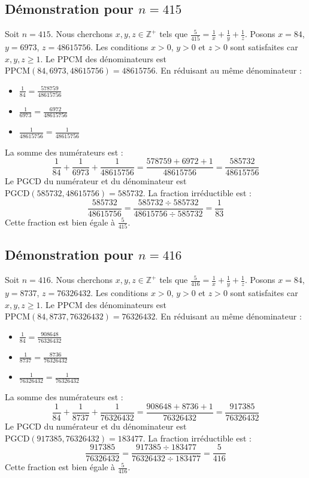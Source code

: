 \documentclass[11pt,a4paper]{article}
\begin{document}
\subsection{Démonstration pour $n = 415$}
Soit $n = 415$. Nous cherchons $x, y, z \in \mathbb{Z}^{+}$ tels que $\frac{5}{415} = \frac{1}{x} + \frac{1}{y} + \frac{1}{z}$.
Posons $x = 84$, $y = 6973$, $z = 48615756$.
Les conditions $x > 0$, $y > 0$ et $z > 0$ sont satisfaites car $x, y, z \geq 1$.
Le PPCM des dénominateurs est $\text{PPCM}(84, 6973, 48615756) = 48615756$.
En réduisant au même dénominateur :
\begin{itemize}
    \item $\frac{1}{84} = \frac{578759}{48615756}$
    \item $\frac{1}{6973} = \frac{6972}{48615756}$
    \item $\frac{1}{48615756} = \frac{1}{48615756}$
\end{itemize}
La somme des numérateurs est :
$$ \frac{1}{84} + \frac{1}{6973} + \frac{1}{48615756} = \frac{578759 + 6972 + 1}{48615756} = \frac{585732}{48615756} $$
Le PGCD du numérateur et du dénominateur est $\text{PGCD}(585732, 48615756) = 585732$.
La fraction irréductible est :
$$ \frac{585732}{48615756} = \frac{585732 \div 585732}{48615756 \div 585732} = \frac{1}{83} $$
Cette fraction est bien égale à $\frac{5}{415}$.

\subsection{Démonstration pour $n = 416$}
Soit $n = 416$. Nous cherchons $x, y, z \in \mathbb{Z}^{+}$ tels que $\frac{5}{416} = \frac{1}{x} + \frac{1}{y} + \frac{1}{z}$.
Posons $x = 84$, $y = 8737$, $z = 76326432$.
Les conditions $x > 0$, $y > 0$ et $z > 0$ sont satisfaites car $x, y, z \geq 1$.
Le PPCM des dénominateurs est $\text{PPCM}(84, 8737, 76326432) = 76326432$.
En réduisant au même dénominateur :
\begin{itemize}
    \item $\frac{1}{84} = \frac{908648}{76326432}$
    \item $\frac{1}{8737} = \frac{8736}{76326432}$
    \item $\frac{1}{76326432} = \frac{1}{76326432}$
\end{itemize}
La somme des numérateurs est :
$$ \frac{1}{84} + \frac{1}{8737} + \frac{1}{76326432} = \frac{908648 + 8736 + 1}{76326432} = \frac{917385}{76326432} $$
Le PGCD du numérateur et du dénominateur est $\text{PGCD}(917385, 76326432) = 183477$.
La fraction irréductible est :
$$ \frac{917385}{76326432} = \frac{917385 \div 183477}{76326432 \div 183477} = \frac{5}{416} $$
Cette fraction est bien égale à $\frac{5}{416}$.
\end{document}
